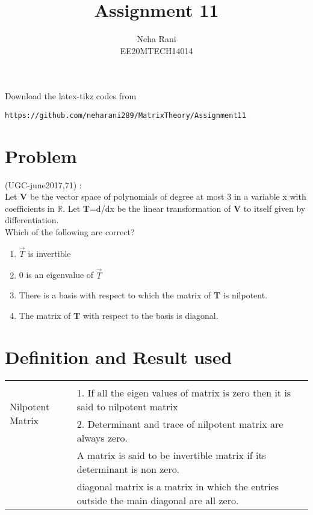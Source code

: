 \documentclass[journal,12pt]{IEEEtran}
\begin{document}
     \def\rightbox#1{\makebox[0in][r]{#1}}
     \def\centbox#1{\makebox[0in]{#1}}
     \def\topbox#1{\raisebox{-\baselineskip}[0in][0in]{#1}}
     \def\midbox#1{\raisebox{-0.5\baselineskip}[0in][0in]{#1}}
\vspace{3cm}
\title{Assignment 11}
\author{Neha Rani\\EE20MTECH14014}
\maketitle
\bigskip
\renewcommand{\thefigure}{\theenumi}
\renewcommand{\thetable}{\theenumi}
%
Download the latex-tikz codes from 
%
\begin{lstlisting}
https://github.com/neharani289/MatrixTheory/Assignment11
\end{lstlisting}
\section{\textbf{Problem}}
(UGC-june2017,71) : \\
%
Let \textbf{V} be the vector space of polynomials of degree at most 3 in a variable x with coefficients in $\mathbb{R}$. Let \textbf{T}=d/dx be the linear transformation of \textbf{V} to itself given by differentiation.\\

Which of the following are correct?\\
\begin{enumerate}
\item $\vec{T}$ is invertible
\item 0 is an eigenvalue of $\vec{T}$
\item There is a basis with respect to which the matrix of \textbf{T} is nilpotent.
\item The matrix of \textbf{T} with respect to the basis  is diagonal.
\end{enumerate}
\section{\textbf{Definition and Result used}}
\begin{longtable}{|l|l|}
	\hline
	\multirow{3}{*}{Nilpotent Matrix} 
	& \\
	& 1. If  all the eigen values of matrix is zero then it is said to nilpotent matrix \\
	& 
   2. Determinant and trace of nilpotent matrix are always zero.
	\hline
	\multirow{3}{*}{Invertible Matrix } & \\
	&
	A matrix is said to be invertible matrix if its determinant is non zero.
    	\hline
    	\multirow{3}{*}{Diagonal matrix} & \\
&
diagonal matrix is a matrix in which the entries outside the main diagonal are all zero.
    \hline
\end{longtable}
\end{document}
